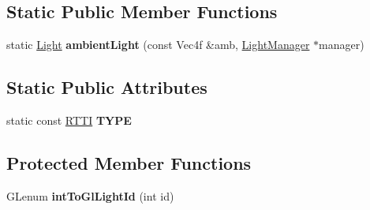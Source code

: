 \subsection*{Static Public Member Functions}
\begin{DoxyCompactItemize}
\item 
\hypertarget{class_light_a73b5878b0115b283ae5b0a82cc827dac}{
static \hyperlink{class_light}{Light} {\bfseries ambientLight} (const Vec4f \&amb, \hyperlink{class_light_manager}{LightManager} $\ast$manager)}
\label{class_light_a73b5878b0115b283ae5b0a82cc827dac}

\end{DoxyCompactItemize}
\subsection*{Static Public Attributes}
\begin{DoxyCompactItemize}
\item 
\hypertarget{class_light_a6a4b7875ce0fe875b9cddde551552526}{
static const \hyperlink{class_r_t_t_i}{RTTI} {\bfseries TYPE}}
\label{class_light_a6a4b7875ce0fe875b9cddde551552526}

\end{DoxyCompactItemize}
\subsection*{Protected Member Functions}
\begin{DoxyCompactItemize}
\item 
\hypertarget{class_light_aec8f8df7c99076d4b165382c0f04b827}{
GLenum {\bfseries intToGlLightId} (int id)}
\label{class_light_aec8f8df7c99076d4b165382c0f04b827}

\end{DoxyCompactItemize}

